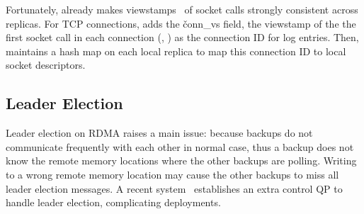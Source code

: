Fortunately, \paxos already makes viewstamps~\cite{paxos:practical} of 
socket calls strongly consistent across replicas. For TCP connections, \xxx 
adds the \v{conn\_vs} field, the viewstamp of the the first socket call in 
each connection (\ie, \accept) as the connection ID for log entries. Then, \xxx 
maintains a hash map on each local replica to map this connection ID to local 
socket descriptors.







\subsection{Leader Election} \label{sec:election}


Leader election on RDMA raises a main issue: because backups do 
not communicate frequently with each other in normal case, thus a backup does 
not know the remote memory locations where the other backups are polling. 
Writing to a wrong remote memory location may cause the other backups to miss 
all leader election messages. A recent system~\cite{dare:hpdc15} establishes 
an extra control QP to handle leader election, complicating deployments.


